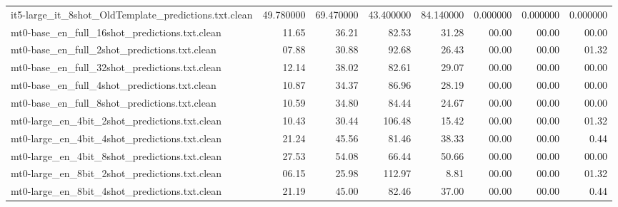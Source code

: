 \begin{tabular}{lrrrrrrr}
it5-large_it_8shot_OldTemplate_predictions.txt.clean & 49.780000 & 69.470000 & 43.400000 & 84.140000 & 0.000000 & 0.000000 & 0.000000 \\
mt0-base_en_full_16shot_predictions.txt.clean & 11.65 & 36.21 & 82.53 & 31.28 & 00.00 & 00.00 & 00.00 \\
mt0-base_en_full_2shot_predictions.txt.clean & 07.88 & 30.88 & 92.68 & 26.43 & 00.00 & 00.00 & 01.32 \\
mt0-base_en_full_32shot_predictions.txt.clean & 12.14 & 38.02 & 82.61 & 29.07 & 00.00 & 00.00 & 00.00 \\
mt0-base_en_full_4shot_predictions.txt.clean & 10.87 & 34.37 & 86.96 & 28.19 & 00.00 & 00.00 & 00.00 \\
mt0-base_en_full_8shot_predictions.txt.clean & 10.59 & 34.80 & 84.44 & 24.67 & 00.00 & 00.00 & 00.00 \\
mt0-large_en_4bit_2shot_predictions.txt.clean & 10.43 & 30.44 & 106.48 & 15.42 & 00.00 & 00.00 & 01.32 \\
mt0-large_en_4bit_4shot_predictions.txt.clean & 21.24 & 45.56 & 81.46 & 38.33 & 00.00 & 00.00 & 0.44 \\
mt0-large_en_4bit_8shot_predictions.txt.clean & 27.53 & 54.08 & 66.44 & 50.66 & 00.00 & 00.00 & 00.00 \\
mt0-large_en_8bit_2shot_predictions.txt.clean & 06.15 & 25.98 & 112.97 & 8.81 & 00.00 & 00.00 & 01.32 \\
mt0-large_en_8bit_4shot_predictions.txt.clean & 21.19 & 45.00 & 82.46 & 37.00 & 00.00 & 00.00 & 0.44 \\
\bottomrule
\end{tabular}
